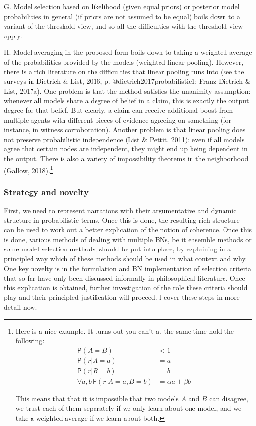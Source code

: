 \documentclass[11pt,dvipsnames,enabledeprecatedfontcommands]{scrartcl}
\newcommand{\pr}[1]{\mathsf{P}(#1)}
\begin{document}
G. Model selection based on likelihood (given equal priors) or posterior
model probabilities in general (if priors are not assumed to be equal)
boils down to a variant of the threshold view, and so all the
difficulties with the threshold view apply.

H. Model averaging in the proposed form boils down to taking a weighted
average of the probabilities provided by the models (weighted linear
pooling). However, there is a rich literature on the difficulties that
linear pooling runs into (see the surveys in Dietrich \& List, 2016, p.
@dietrich2017probabilistic1; Franz Dietrich \& List, 2017a). One problem
is that the method satisfies the unanimity assumption: whenever all
models share a degree of belief in a claim, this is exactly the output
degree for that belief. But clearly, a claim can receive additional
boost from multiple agents with different pieces of evidence agreeing on
something (for instance, in witness corroboration). Another problem is
that linear pooling does not preserve probabilistic independence (List
\& Pettit, 2011): even if all models agree that certain nodes are
independent, they might end up being dependent in the output. There is
also a variety of impossibility theorems in the neighborhood (Gallow,
2018).\footnote{Here is a nice example. It turns out you can't at the same time hold the following: 
\begin{align}
\pr{A=B} & <1\\
\pr{r\vert A=a} & = a \\
\pr{r\vert B=b} & = b \\
\forall a,b \, \pr{r \vert A =a, B = b} & =  \alpha a + \beta b
\end{align}

\noindent This means that that it is impossible that two models $A$ and $B$ can disagree, we trust each of them separately if we only learn about one model, and we take a weighted average if we learn about both.}

\hypertarget{strategy-and-novelty}{%
\subsubsection{Strategy and novelty}\label{strategy-and-novelty}}

First, we need to represent narrations with their argumentative and
dynamic structure in probabilistic terms. Once this is done, the
resulting rich structure can be used to work out a better explication of
the notion of coherence. Once this is done, various methods of dealing
with multiple BNs, be it ensemble methods or some model selection
methods, should be put into place, by explaining in a principled way
which of these methods should be used in what context and why. One key
novelty is in the formulation and BN implementation of selection
criteria that so far have only been discussed informally in
philosophical literature. Once this explication is obtained, further
investigation of the role these criteria should play and their
principled justification will proceed. I cover these steps in more
detail now.
\end{document}
